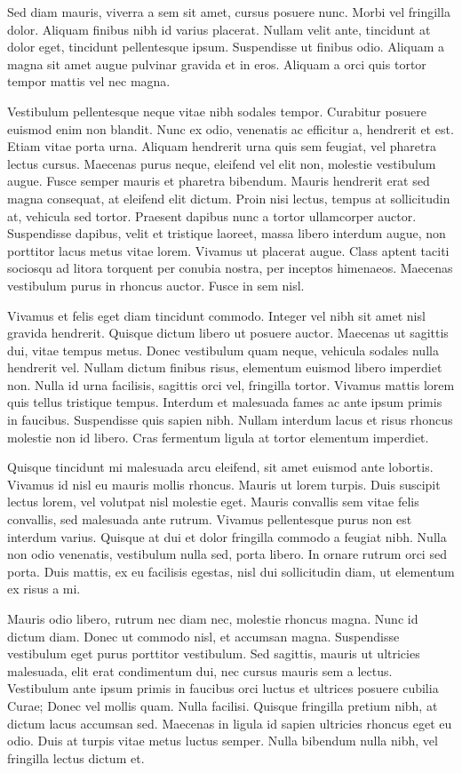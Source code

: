 Sed diam mauris, viverra a sem sit amet, cursus posuere nunc. Morbi vel fringilla dolor. Aliquam finibus nibh id varius placerat. Nullam velit ante, tincidunt at dolor eget, tincidunt pellentesque ipsum. Suspendisse ut finibus odio. Aliquam a magna sit amet augue pulvinar gravida et in eros. Aliquam a orci quis tortor tempor mattis vel nec magna.

Vestibulum pellentesque neque vitae nibh sodales tempor. Curabitur posuere euismod enim non blandit. Nunc ex odio, venenatis ac efficitur a, hendrerit et est. Etiam vitae porta urna. Aliquam hendrerit urna quis sem feugiat, vel pharetra lectus cursus. Maecenas purus neque, eleifend vel elit non, molestie vestibulum augue. Fusce semper mauris et pharetra bibendum. Mauris hendrerit erat sed magna consequat, at eleifend elit dictum. Proin nisi lectus, tempus at sollicitudin at, vehicula sed tortor. Praesent dapibus nunc a tortor ullamcorper auctor. Suspendisse dapibus, velit et tristique laoreet, massa libero interdum augue, non porttitor lacus metus vitae lorem. Vivamus ut placerat augue. Class aptent taciti sociosqu ad litora torquent per conubia nostra, per inceptos himenaeos. Maecenas vestibulum purus in rhoncus auctor. Fusce in sem nisl.

Vivamus et felis eget diam tincidunt commodo. Integer vel nibh sit amet nisl gravida hendrerit. Quisque dictum libero ut posuere auctor. Maecenas ut sagittis dui, vitae tempus metus. Donec vestibulum quam neque, vehicula sodales nulla hendrerit vel. Nullam dictum finibus risus, elementum euismod libero imperdiet non. Nulla id urna facilisis, sagittis orci vel, fringilla tortor. Vivamus mattis lorem quis tellus tristique tempus. Interdum et malesuada fames ac ante ipsum primis in faucibus. Suspendisse quis sapien nibh. Nullam interdum lacus et risus rhoncus molestie non id libero. Cras fermentum ligula at tortor elementum imperdiet.

Quisque tincidunt mi malesuada arcu eleifend, sit amet euismod ante lobortis. Vivamus id nisl eu mauris mollis rhoncus. Mauris ut lorem turpis. Duis suscipit lectus lorem, vel volutpat nisl molestie eget. Mauris convallis sem vitae felis convallis, sed malesuada ante rutrum. Vivamus pellentesque purus non est interdum varius. Quisque at dui et dolor fringilla commodo a feugiat nibh. Nulla non odio venenatis, vestibulum nulla sed, porta libero. In ornare rutrum orci sed porta. Duis mattis, ex eu facilisis egestas, nisl dui sollicitudin diam, ut elementum ex risus a mi.

Mauris odio libero, rutrum nec diam nec, molestie rhoncus magna. Nunc id dictum diam. Donec ut commodo nisl, et accumsan magna. Suspendisse vestibulum eget purus porttitor vestibulum. Sed sagittis, mauris ut ultricies malesuada, elit erat condimentum dui, nec cursus mauris sem a lectus. Vestibulum ante ipsum primis in faucibus orci luctus et ultrices posuere cubilia Curae; Donec vel mollis quam. Nulla facilisi. Quisque fringilla pretium nibh, at dictum lacus accumsan sed. Maecenas in ligula id sapien ultricies rhoncus eget eu odio. Duis at turpis vitae metus luctus semper. Nulla bibendum nulla nibh, vel fringilla lectus dictum et.

